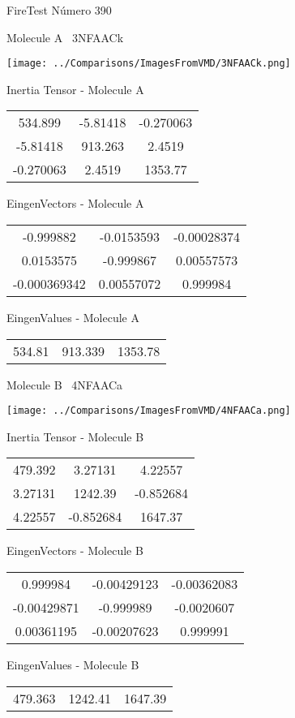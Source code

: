 \vtab[-3cm]
\begin{center}
{\large FireTest \tab Número 390}
\end{center}
\begin{multicols}{2}
\begin{center}

Molecule A \
3NFAACk

\texttt{[image: ../Comparisons/ImagesFromVMD/3NFAACk.png]}

Inertia Tensor - Molecule A \\
\begin{tabular}{|c c c|}
534.899	 & 	-5.81418	 & 	-0.270063	 \\
-5.81418	 & 	913.263	 & 	2.4519	 \\
-0.270063	 & 	2.4519	 & 	1353.77
\end{tabular}

\vtab
 EingenVectors - Molecule A     \\
\begin{tabular}{|c c c|}
-0.999882	 & 	-0.0153593	 & 	-0.00028374	 \\
0.0153575	 & 	-0.999867	 & 	0.00557573	 \\
-0.000369342	 & 	0.00557072	 & 	0.999984
\end{tabular}

\vtab
 EingenValues - Molecule A     \\
\begin{tabular}{|c c c|}
534.81	 & 	913.339	 & 	1353.78	 \\
\end{tabular}
\columnbreak

Molecule B \
4NFAACa

\texttt{[image: ../Comparisons/ImagesFromVMD/4NFAACa.png]}

Inertia Tensor - Molecule B \\
\begin{tabular}{|c c c|}
479.392	 & 	3.27131	 & 	4.22557	 \\
3.27131	 & 	1242.39	 & 	-0.852684	 \\
4.22557	 & 	-0.852684	 & 	1647.37
\end{tabular}

\vtab
 EingenVectors - Molecule B     \\
\begin{tabular}{|c c c|}
0.999984	 & 	-0.00429123	 & 	-0.00362083	 \\
-0.00429871	 & 	-0.999989	 & 	-0.0020607	 \\
0.00361195	 & 	-0.00207623	 & 	0.999991
\end{tabular}

\vtab
 EingenValues - Molecule B     \\
\begin{tabular}{|c c c|}
479.363	 & 	1242.41	 & 	1647.39	 \\
\end{tabular}

\end{center}
\end{multicols}

